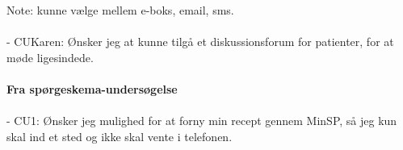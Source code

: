 Note: kunne vælge mellem e-boks, email, sms.\\
\\
- CUKaren: Ønsker jeg at kunne tilgå et diskussionsforum for patienter, for at møde ligesindede.\\
\\
\textbf{Fra spørgeskema-undersøgelse}\\\\
- CU1: Ønsker jeg mulighed for at forny min recept gennem MinSP, så jeg kun skal ind et sted og ikke skal vente i telefonen.
%
